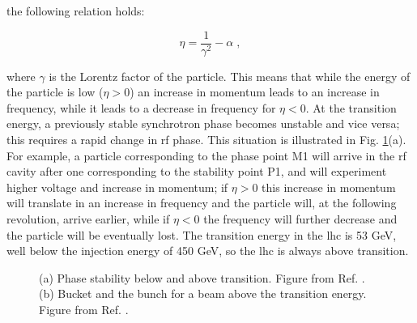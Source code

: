 \noindent the following relation holds:

\begin{equation}
\eta = \frac{1}{\gamma^2} - \alpha \; ,
\end{equation}

where $\gamma$ is the Lorentz factor of the particle. This means that while the energy of the particle is low ($\eta>0$) an increase in momentum leads to an increase in frequency, while it leads to a decrease in frequency for $\eta<0$. At the transition energy, a previously stable synchrotron phase becomes unstable and vice versa; this requires a rapid change in \gls{rf} phase. This situation is illustrated in Fig. \ref{fig:lhc:phase}(a). For example, a particle corresponding to the phase point M1 will arrive in the \gls{rf} cavity after one corresponding to the stability point P1, and will experiment higher voltage and increase in momentum; if $\eta>0$ this increase in momentum will translate in an increase in frequency and the particle will, at the following revolution, arrive earlier, while if $\eta<0$ the frequency will further decrease and the particle will be eventually lost.  The transition energy in the \gls{lhc} is 53 GeV, well below the injection energy of 450 GeV, so the \gls{lhc} is always above transition. 

\begin{figure}[ht]
\centering
{}
\caption{(a) Phase stability below and above transition. Figure from Ref. \cite{Tecker:2016mlq}. (b) Bucket and the bunch for a beam above the transition energy. Figure from Ref. \cite{Baird:1017689}.}
\label{fig:lhc:phase}
\end{figure}


